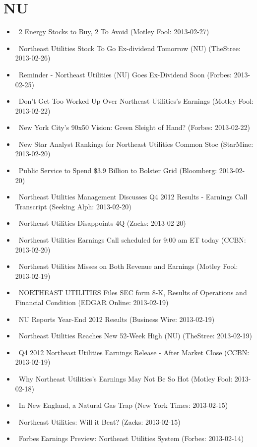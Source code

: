 \documentclass[11pt,asymmetric]{article}
\begin{document}
\section*{NU}
\begin{itemize}
\item\ 2 Energy Stocks to Buy, 2 To Avoid (Motley Fool: 2013-02-27)
\item\ Northeast Utilities Stock To Go Ex-dividend Tomorrow (NU) (TheStree: 2013-02-26)
\item\ Reminder - Northeast Utilities (NU) Goes Ex-Dividend Soon (Forbes: 2013-02-25)
\item\ Don't Get Too Worked Up Over Northeast Utilities's Earnings (Motley Fool: 2013-02-22)
\item\ New York City's 90x50 Vision: Green Sleight of Hand? (Forbes: 2013-02-22)
\item\ New Star Analyst Rankings for Northeast Utilities Common Stoc (StarMine: 2013-02-20)
\item\ Public Service to Spend \$3.9 Billion to Bolster Grid (Bloomberg: 2013-02-20)
\item\ Northeast Utilities Management Discusses Q4 2012 Results - Earnings Call Transcript (Seeking Alph: 2013-02-20)
\item\ Northeast Utilities Disappoints 4Q (Zacks: 2013-02-20)
\item\ Northeast Utilities Earnings Call scheduled for 9:00 am ET today (CCBN: 2013-02-20)
\item\ Northeast Utilities Misses on Both Revenue and Earnings (Motley Fool: 2013-02-19)
\item\ NORTHEAST UTILITIES Files SEC form 8-K, Results of Operations and Financial Condition (EDGAR Online: 2013-02-19)
\item\ NU Reports Year-End 2012 Results (Business Wire: 2013-02-19)
\item\ Northeast Utilities Reaches New 52-Week High (NU) (TheStree: 2013-02-19)
\item\ Q4 2012 Northeast Utilities Earnings Release - After Market Close (CCBN: 2013-02-19)
\item\ Why Northeast Utilities's Earnings May Not Be So Hot (Motley Fool: 2013-02-18)
\item\ In New England, a Natural Gas Trap (New York Times: 2013-02-15)
\item\ Northeast Utilities: Will it Beat? (Zacks: 2013-02-15)
\item\ Forbes Earnings Preview: Northeast Utilities System (Forbes: 2013-02-14)

\end{itemize}
\end{document}
